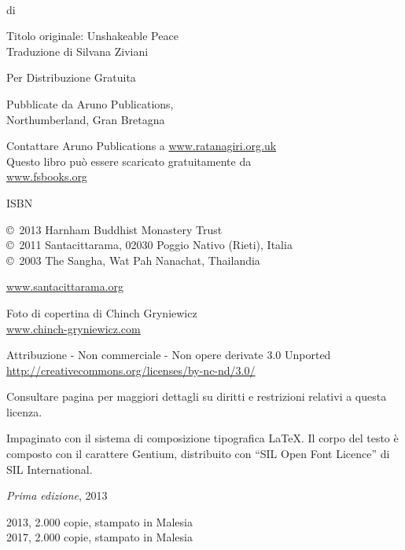 {\small\setlength{\parskip}{0.8em}\setlength{\parindent}{0em}%
{\raggedright%

\thetitle\\
di \theauthor

Titolo originale: Unshakeable Peace\\
Traduzione di Silvana Ziviani

Per Distribuzione Gratuita

Pubblicate da Aruno Publications,\\
Northumberland, Gran Bretagna

Contattare Aruno Publications a \href{http://ratanagiri.org.uk}{www.ratanagiri.org.uk}\\
Questo libro può essere scaricato gratuitamente da\\
\href{http://fsbooks.org/}{www.fsbooks.org}

ISBN \theISBN

\copyright\ 2013 Harnham Buddhist Monastery Trust\\
\copyright\ 2011 Santacittarama, 02030 Poggio Nativo (Rieti), Italia\\
\copyright\ 2003 The Sangha, Wat Pah Nanachat, Thailandia

\href{http://www.santacittarama.org/}{www.santacittarama.org}

Foto di copertina di Chinch Gryniewicz\\
\href{http://chinch-gryniewicz.com}{www.chinch-gryniewicz.com}

\vfill

{\footnotesize
Attribuzione - Non commerciale - Non opere derivate 3.0 Unported\\
\href{http://creativecommons.org/licenses/by-nc-nd/3.0/}{http://creativecommons.org/licenses/by-nc-nd/3.0/}

Consultare pagina \pageref{copyright-details} per maggiori dettagli su diritti e restrizioni relativi a questa licenza.

Impaginato con il sistema di composizione tipografica {\selectfont\LaTeX}. Il corpo del testo è composto con il carattere Gentium, distribuito con ``SIL Open Font Licence'' di SIL International.

\textit{Prima edizione}, 2013

2013, 2.000 copie, stampato in Malesia\\
2017, 2.000 copie, stampato in Malesia

}
}}


